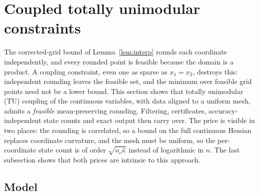 
\section{Coupled totally unimodular constraints}\label{sec:tu}

The corrected-grid bound of Lemma~\ref{lem:interp} rounds each coordinate
independently, and every rounded point is feasible because the domain is a
product. A coupling constraint, even one as sparse as $x_1=x_2$, destroys
this: independent rounding leaves the feasible set, and the minimum over
feasible grid points need not be a lower bound. This section shows that
totally unimodular (TU) coupling of the continuous variables, with data
aligned to a uniform mesh, admits a \emph{feasible} mean-preserving rounding.
Filtering, certificates, accuracy-independent state counts and exact output
then carry over. The price is visible in two places: the rounding is
correlated, so a bound on the full continuous Hessian replaces coordinate
curvature, and the mesh must be uniform, so the per-coordinate state count is
of order $\sqrt{n_c\hat\kappa}$ instead of logarithmic in $n$. The last
subsection shows that both prices are intrinsic to this approach.

\subsection{Model}\label{sec:tu-model}

